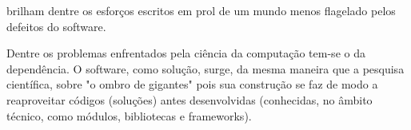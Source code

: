     brilham dentre os esforços escritos em prol de um mundo menos flagelado pelos defeitos
    do software.

    Dentre os problemas enfrentados pela ciência da computação tem-se o da dependência.
    O software, como solução, surge, da mesma maneira que a pesquisa científica, sobre
    "o ombro de gigantes" pois sua construção se faz de modo a reaproveitar códigos
    (soluções) antes desenvolvidas (conhecidas, no âmbito técnico, como módulos,
    bibliotecas e frameworks).
    
    

    
    
    
    

\newpage
